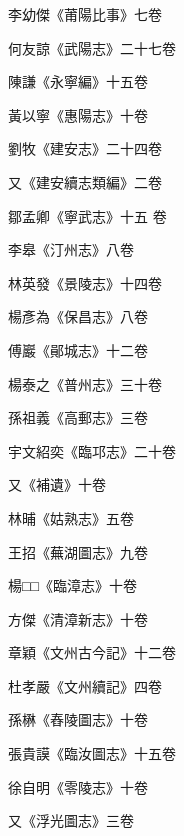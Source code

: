 \begin{pinyinscope}
 李幼傑《莆陽比事》七卷



 何友諒《武陽志》二十七卷



 陳謙《永寧編》十五卷



 黃以寧《惠陽志》十卷



 劉牧《建安志》二十四卷



 又《建安續志類編》二卷



 鄒孟卿《寧武志》十五
 卷



 李皋《汀州志》八卷



 林英發《景陵志》十四卷



 楊彥為《保昌志》八卷



 傅巖《鄖城志》十二卷



 楊泰之《普州志》三十卷



 孫祖義《高郵志》三卷



 宇文紹奕《臨邛志》二十卷



 又《補遺》十卷



 林晡《姑熟志》五卷



 王招《蕪湖圖志》九卷



 楊□□《臨漳志》十卷



 方傑《清漳新志》十卷



 章穎《文州古今記》十二卷



 杜孝嚴《文州續記》四卷



 孫楙《舂陵圖志》十卷



 張貴謨《臨汝圖志》十五卷



 徐自明《零陵志》十卷



 又《浮光圖志》三卷




\end{pinyinscope}
